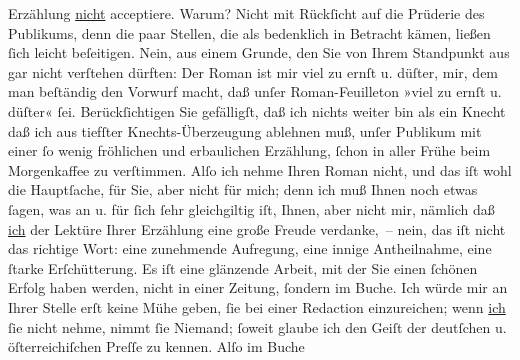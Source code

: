 \begin{ledgroupsized}[t]{13cm}
               Erzählung \uline{nicht} acceptiere.\pend
           \pstart
           Warum? Nicht mit Rückſicht auf die Prüderie des Publikums, denn die paar Stellen, die
               als bedenklich in Betracht kämen, ließen ſich leicht beſeitigen. Nein, aus einem
               Grunde, den Sie von Ihrem Standpunkt aus gar nicht verſtehen dürften: Der Roman ist mir viel zu ernſt u.
               düſter, mir, dem man beſtändig den Vorwurf macht, daß unſer Roman-Feuilleton »viel zu
               ernſt u. düſter« ſei. Berückſichtigen Sie gefälligſt, daß ich nichts weiter bin als
               ein Knecht \label{T_L00186_1v}\label{T_L00186_1h} daß ich aus
               tiefſter Knechts-Überzeugung ablehnen muß, unſer Publikum mit einer ſo wenig
               fröhlichen und erbaulichen Erzählung, ſchon in aller Frühe beim Morgenkaffee zu
               verſtimmen.\pend
           \pstart
           Alſo ich nehme Ihren Roman
               nicht, und das iſt wohl die Hauptſache, für Sie, aber nicht für mich; denn ich muß
               Ihnen noch etwas ſagen, was an u. für ſich ſehr gleichgiltig iſt, Ihnen, aber nicht
               mir, nämlich daß {\pb}\uline{ich} der Lektüre Ihrer Erzählung eine große Freude verdanke, – nein, das iſt
                   nicht das richtige Wort: eine zunehmende Aufregung, eine innige
               Antheilnahme, eine ſtarke Erſchütterung. Es iſt eine glänzende Arbeit, mit der Sie
               einen ſchönen Erfolg haben werden, nicht in einer Zeitung, ſondern im Buche. Ich
               würde mir an Ihrer Stelle erſt keine Mühe geben, ſie bei einer Redaction
               einzureichen; wenn \uline{ich}{ }ſie nicht nehme, nimmt ſie Niemand; ſoweit glaube
               ich den Geiſt der deutſchen u. öſterreichiſchen Preſſe zu kennen. Alſo im Buche

\end{ledgroupsized}
